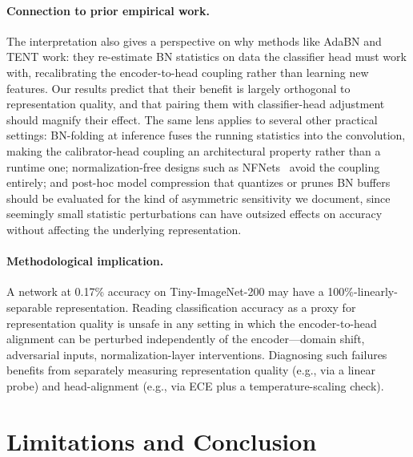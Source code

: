 \documentclass{article}
\begin{document}
\paragraph{Connection to prior empirical work.} The interpretation also gives a perspective on why methods like AdaBN \citep{li2018revisiting} and TENT \citep{wang2021tent} work: they re-estimate BN statistics on data the classifier head must work with, recalibrating the encoder-to-head coupling rather than learning new features. Our results predict that their benefit is largely orthogonal to representation quality, and that pairing them with classifier-head adjustment should magnify their effect. The same lens applies to several other practical settings: BN-folding at inference fuses the running statistics into the convolution, making the calibrator-head coupling an architectural property rather than a runtime one; normalization-free designs such as NFNets~\citep{brock2021highperformance} avoid the coupling entirely; and post-hoc model compression that quantizes or prunes BN buffers should be evaluated for the kind of asymmetric sensitivity we document, since seemingly small statistic perturbations can have outsized effects on accuracy without affecting the underlying representation.

\paragraph{Methodological implication.} A network at 0.17\% accuracy on Tiny-ImageNet-200 may have a 100\%-linearly-separable representation. Reading classification accuracy as a proxy for representation quality is unsafe in any setting in which the encoder-to-head alignment can be perturbed independently of the encoder---domain shift, adversarial inputs, normalization-layer interventions. Diagnosing such failures benefits from separately measuring representation quality (e.g., via a linear probe) and head-alignment (e.g., via ECE plus a temperature-scaling check).

\section{Limitations and Conclusion}
\label{sec:limitations}
\end{document}
